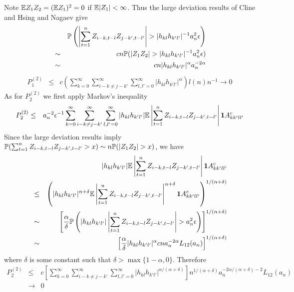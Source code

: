 \documentclass{article}
\begin{document}
Note $\E Z_1 Z_2 = (\E Z_1)^2 = 0$ if $\E|Z_1| < \infty$. Thus the
large deviation results of Cline and Hsing \cite{cline:hsing:1998} and
Nagaev \cite{nagaev:1979} give
\begin{eqnarray*}
  && \P\left(
    \left| \sum_{t=1}^n  Z_{i-k,t-l} Z_{j-k',t-l'}
    \right| > | h_{kl} h_{k'l'}|^{-1} a_n^2 \epsilon 
  \right) \\
  &\sim& c n \P(|Z_1 Z_2| > | h_{kl} h_{k'l'}|^{-1} a_n^2 \epsilon) \\
  &\sim& c n | h_{kl} h_{k'l'}|^{\alpha} a_n^{-2\alpha}
\end{eqnarray*}
\begin{eqnarray*}
  P^{(2)}_1 &\leq& c \left( \sum_{k=0}^\infty \sum_{i-k \neq j-k'}^\infty
  \sum_{l,l'=0}^\infty | h_{kl} h_{k'l'}|^{\alpha} \right) l(n) n^{-1}
\to 0
\end{eqnarray*}
As for $P^{(2)}_2$ we first apply Markov's inequality
\begin{eqnarray*}
  P^{(2)}_2 &\leq& a_n^{-2} \epsilon^{-1}
  \sum_{k=0}^\infty \sum_{i-k \neq j-k'}^\infty
  \sum_{l,l'=0}^\infty | h_{kl} h_{k'l'}| \E \left|
  \sum_{t=1}^n  Z_{i-k,t-l} Z_{j-k',t-l'} \right|
  \I{A^c_{kk'll'}}
\end{eqnarray*}
Since the large deviation results imply $\P(\sum_{t=1}^n  Z_{i-k,t-l}
Z_{j-k',t-l'} > x) \sim n \P(|Z_1 Z_2| > x)$, we have
\begin{eqnarray*}
  && | h_{kl} h_{k'l'}| \E \left| \sum_{t=1}^n  Z_{i-k,t-l} Z_{j-k',t-l'} \right|
  \I{A^c_{kk'll'}} \\
  &\leq& \left(
    | h_{kl} h_{k'l'}|^{\alpha + \delta} \E \left| \sum_{t=1}^n
      Z_{i-k,t-l} Z_{j-k',t-l'} \right|^{\alpha + \delta}
    \I{A^c_{kk'll'}} \right)^{1/(\alpha + \delta)} \\
    &\sim& \left[
      {\alpha \over \delta} \P\left(
      | h_{kl} h_{k'l'}| \left| \sum_{t=1}^n  Z_{i-k,t-l} Z_{j-k',t-l'}
      \right| > a_n^2 \epsilon \right) \right]^{1/(\alpha + \delta)} \\
  &\sim& \left[
    {\alpha \over \delta} | h_{kl} h_{k'l'}|^{\alpha}
    c n a_n^{-2\alpha} L_{12}(a_n)
    \right]^{1/(\alpha + \delta)}
\end{eqnarray*}
where $\delta$ is some constant such that $\delta > \max\{1-\alpha,
0\}$. Therefore
\begin{eqnarray*}
  P^{(2)}_2 &\leq& c  \left[\sum_{k=0}^\infty \sum_{i-k \neq j-k'}^\infty
  \sum_{l,l'=0}^\infty |h_{kl} h_{k'l'}|^{\alpha/(\alpha + \delta)}\right]
  n^{1/(\alpha + \delta)} a_n^{-2\alpha/(\alpha + \delta )-2} L_{12}(a_n)\\
  &\to&  0
\end{eqnarray*}
\end{document}
